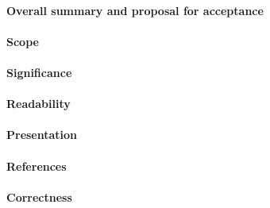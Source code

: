 \documentclass{jhps}
\begin{document}
\paragraph{Overall summary and proposal for acceptance}

\paragraph{Scope}   %

\paragraph{Significance}   %

\paragraph{Readability}   %

\paragraph{Presentation}

\paragraph{References}   %

\paragraph{Correctness}   %
\end{document}
